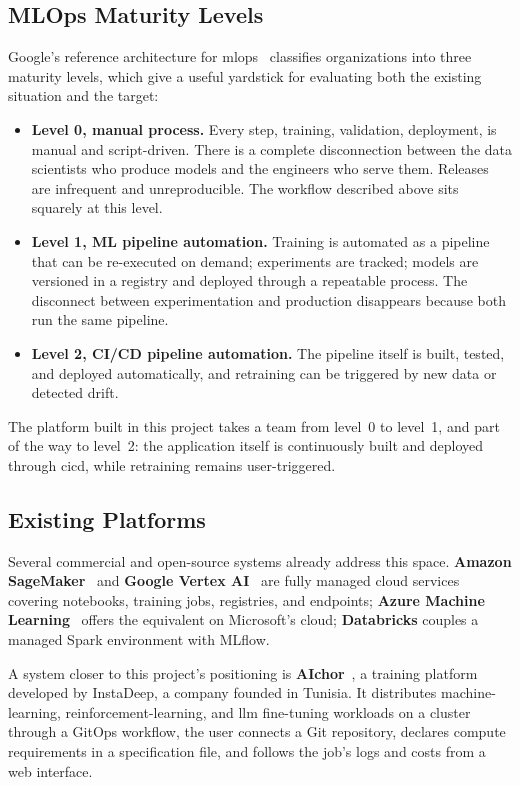 \subsection{MLOps Maturity Levels}
Google's reference architecture for \gls{mlops}~\cite{google_mlops} classifies
organizations into three maturity levels, which give a useful yardstick for
evaluating both the existing situation and the target:
\begin{itemize}[leftmargin=1.4em]
  \item \textbf{Level 0, manual process.} Every step, training, validation,
        deployment, is manual and script-driven. There is a complete disconnection
        between the data scientists who produce models and the engineers who serve
        them. Releases are infrequent and unreproducible. The workflow described
        above sits squarely at this level.
  \item \textbf{Level 1, ML pipeline automation.} Training is automated as a
        pipeline that can be re-executed on demand; experiments are tracked;
        models are versioned in a registry and deployed through a repeatable
        process. The disconnect between experimentation and production disappears
        because both run the same pipeline.
  \item \textbf{Level 2, CI/CD pipeline automation.} The pipeline itself is built,
        tested, and deployed automatically, and retraining can be triggered by new
        data or detected drift.
\end{itemize}
The platform built in this project takes a team from level~0 to level~1, and part
of the way to level~2: the application itself is continuously built and deployed
through \gls{cicd}, while retraining remains user-triggered.

\subsection{Existing Platforms}
Several commercial and open-source systems already address this space.
\textbf{Amazon SageMaker}~\cite{sagemaker} and \textbf{Google Vertex
AI}~\cite{vertexai} are fully managed cloud services covering notebooks, training
jobs, registries, and endpoints; \textbf{Azure Machine Learning}~\cite{azure_ml}
offers the equivalent on Microsoft's cloud; \textbf{Databricks} couples a managed
Spark environment with MLflow.

A system closer to this project's positioning is \textbf{AIchor}~\cite{aichor},
a training platform developed by InstaDeep, a company founded in Tunisia. It
distributes machine-learning, reinforcement-learning, and \gls{llm} fine-tuning
workloads on a cluster through a GitOps workflow, the user connects a Git
repository, declares compute requirements in a specification file, and follows
the job's logs and costs from a web interface.

